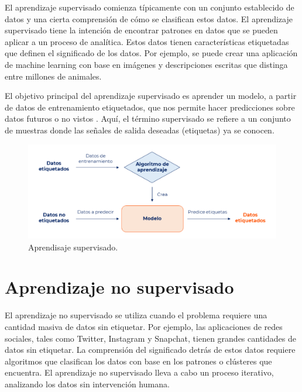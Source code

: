 El aprendizaje supervisado comienza típicamente con un conjunto establecido de datos y una cierta comprensión de cómo se clasifican estos datos. El aprendizaje supervisado tiene la intención de encontrar patrones en datos que se pueden aplicar a un proceso de analítica. Estos datos tienen características etiquetadas que definen el significado de los datos. Por ejemplo, se puede crear una aplicación de machine learning con base en imágenes y descripciones escritas que distinga entre millones de animales\cite{ibm}.

\vspace{1\baselineskip}
El objetivo principal del aprendizaje supervisado es aprender un modelo, a partir de datos de entrenamiento etiquetados, que nos permite hacer predicciones sobre datos futuros o no vistos \cite{mirjalili2020python}. Aquí, el término supervisado se refiere a un conjunto de muestras donde las señales
de salida deseadas (etiquetas) ya se conocen.

\begin{figure}[H]
  \begin{center}
    \includegraphics[scale=0.60]{./aprendisaje_supervisado.png}
    \caption{Aprendisaje supervisado\cite{decide}.}
    \label{fig:aprendisajesupervisado}
  \end{center}
\end{figure}

\section{Aprendizaje no supervisado}

El aprendizaje no supervisado se utiliza cuando el problema requiere una cantidad masiva de datos sin etiquetar. Por ejemplo, las aplicaciones de redes sociales, tales como Twitter, Instagram y Snapchat, tienen grandes cantidades de datos sin etiquetar. La comprensión del significado detrás de estos datos requiere algoritmos que clasifican los datos con base en los patrones o clústeres que encuentra. El aprendizaje no supervisado lleva a cabo un proceso iterativo, analizando los datos sin intervención humana\cite{ibm}.

